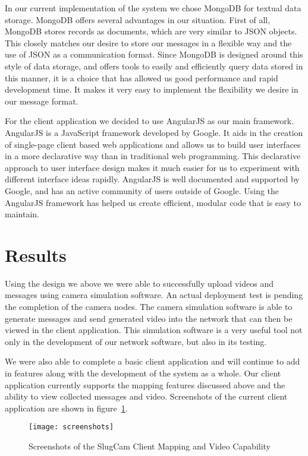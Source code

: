 In our current implementation of the system we chose MongoDB\cite{mongo_home}
for textual data storage. MongoDB offers several advantages in our situation.
First of all, MongoDB stores records as documents, which are very similar to
JSON objects.  This closely matches our desire to store our messages in a
flexible way and the use of JSON as a communication format. Since MongoDB is
designed around this style of data storage, and offers tools to easily and
efficiently query data stored in this manner, it is a choice that has allowed us
good performance and rapid development time. It makes it very easy to implement
the flexibility we desire in our message format.

For the client application we decided to use AngularJS\cite{angular_home} as our
main framework. AngularJS is a JavaScript framework developed by Google. It aids
in the creation of single-page client based web applications and allows us to
build user interfaces in a more declarative way than in traditional web
programming. This declarative approach to user interface design makes it much
easier for us to experiment with different interface ideas rapidly. AngularJS is
well documented and supported by Google, and has an active community of users
outside of Google. Using the AngularJS framework has helped us create efficient,
modular code that is easy to maintain.

\section{Results}

Using the design we above we were able to successfully upload videos and
messages using camera simulation software. An actual deployment test is pending
the completion of the camera nodes. The camera simulation software is able to
generate messages and send generated video into the network that can then be
viewed in the client application. This simulation software is a very useful tool
not only in the development of our network software, but also in its testing.

We were also able to complete a basic client application and will continue to
add in features along with the development of the system as a whole. Our client
application currently supports the mapping features discussed above and the
ability to view collected messages and video. Screenshots of the current client
application are shown in figure~\ref{fig_screens}.


\begin{figure}[!t]
\centering
\texttt{[image: screenshots]}
\caption{Screenshots of the SlugCam Client Mapping and Video Capability}
\label{fig_screens}
\end{figure}

